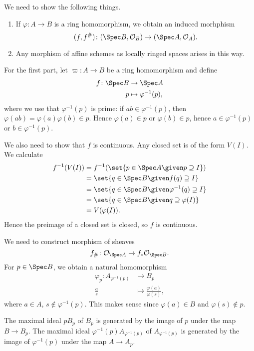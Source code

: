 We need to show the following things.
\begin{enumerate}
	\item If $\varphi\colon A\to B$ is a ring homomorphism, we obtain an
		induced morhphism
		\[ (f, f^\#)\colon (\Spec B, \mathcal{O}_B)\to (\Spec A, \mathcal{O}_A). \]
	\item Any morphism of affine schemes as locally ringed spaces arises in
		this way.
\end{enumerate}

For the first part, let $\varpi\colon A\to B$ be a ring homomorphism and define
\begin{align*}
	f\colon \Spec B&\to \Spec A\\
	p&\mapsto \varphi^{-1}(p),
\end{align*}
where we use that $\varphi^{-1}(p)$ is prime: if $ab \in \varphi^{-1}(p)$, then
$\varphi(ab) = \varphi(a)\varphi(b) \in p$. Hence $\varphi(a) \in p$ or
$\varphi(b) \in p$, hence $a \in \varphi^{-1}(p)$ or $b \in \varphi^{-1}(p)$.

We also need to show that $f$ is continuous. Any closed set is of the form
$V(I)$. We calculate
\begin{align*}
	f^{-1}(V(I)) &= f^{-1}(\set{p \in \Spec A\given p\supseteq I})\\
	&= \set{q \in \Spec B\given f(q) \supseteq I}\\
	&= \set{q \in \Spec B\given \varphi^{-1}(q)\supseteq I}\\
	&= \set{q \in \Spec B\given q\supseteq \varphi(I)}\\
	&= V(\varphi(I)).
\end{align*}
Hence the preimage of a closed set is closed, so $f$ is continuous.

We need to construct morphism of sheaves
\[ f_\#\colon \mathcal{O}_{\Spec A} \to f_*\mathcal{O}_{\Spec B}. \]
For $p \in \Spec B$, we obtain a natural homomorphism
\begin{align*}
	\varphi_p\colon A_{\varphi^{-1}(p)}&\to B_p\\
	\frac{a}{s}&\mapsto \frac{\varphi(a)}{\varphi(s)},
\end{align*}
where $a \in A$, $s\notin \varphi^{-1}(p)$. This makes sense since $\varphi(a) \in B$
and $\varphi(s)\notin p$.

The maximal ideal $pB_p$ of $B_p$ is generated by the image of $p$ under the map
$B\to B_p$. The maximal ideal $\varphi^{-1}(p)A_{\varphi^{-1}(p)}$ of $A_{\varphi^{-1}(p)}$ is generated by the image
of $\varphi^{-1}(p)$ under the map $A\to A_p$.

